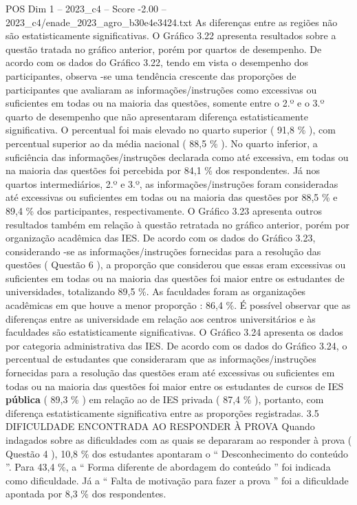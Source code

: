 \begin{textsample}{POS Dim 1 – 2023\_c4 – Score -2.00 – 2023\_c4/enade\_2023\_agro\_b30e4e3424.txt}
As diferenças entre as regiões não são estatisticamente significativas.
O Gráfico 3.22 apresenta resultados sobre a questão tratada no gráfico anterior, porém por quartos de desempenho.
De acordo com os dados do Gráfico 3.22, tendo em vista o desempenho dos participantes, observa -se uma tendência crescente das proporções de participantes que avaliaram as informações/instruções como excessivas ou suficientes em todas ou na maioria das questões, somente entre o 2.º e o 3.º quarto de desempenho que não apresentaram diferença estatisticamente significativa.
O percentual foi mais elevado no quarto superior ( 91,8 \% ), com percentual superior ao da média nacional ( 88,5 \% ).
No quarto inferior, a suficiência das informações/instruções declarada como até excessiva, em todas ou na maioria das questões foi percebida por 84,1 \% dos respondentes.
Já nos quartos intermediários, 2.º e 3.º, as informações/instruções foram consideradas até excessivas ou suficientes em todas ou na maioria das questões por 88,5 \% e 89,4 \% dos participantes, respectivamente.
O Gráfico 3.23 apresenta outros resultados também em relação à questão retratada no gráfico anterior, porém por organização acadêmica das IES.
De acordo com os dados do Gráfico 3.23, considerando -se as informações/instruções fornecidas para a resolução das questões ( Questão 6 ), a proporção que considerou que essas eram excessivas ou suficientes em todas ou na maioria das questões foi maior entre os estudantes de universidades, totalizando 89,5 \%.
As faculdades foram as organizações acadêmicas em que houve a menor proporção : 86,4 \%.
É possível observar que as diferenças entre as universidade em relação aos centros universitários e às faculdades são estatisticamente significativas.
O Gráfico 3.24 apresenta os dados por categoria administrativa das IES.
De acordo com os dados do Gráfico 3.24, o percentual de estudantes que consideraram que as informações/instruções fornecidas para a resolução das questões eram até excessivas ou suficientes em todas ou na maioria das questões foi maior entre os estudantes de cursos de IES \textbf{pública} ( 89,3 \% ) em relação ao de IES privada ( 87,4 \% ), portanto, com diferença estatisticamente significativa entre as proporções registradas. 3.5 DIFICULDADE ENCONTRADA AO RESPONDER À PROVA Quando indagados sobre as dificuldades com as quais se depararam ao responder à prova ( Questão 4 ), 10,8 \% dos estudantes apontaram o “ Desconhecimento do conteúdo ”.
Para 43,4 \%, a “ Forma diferente de abordagem do conteúdo ” foi indicada como dificuldade.
Já a “ Falta de motivação para fazer a prova ” foi a dificuldade apontada por 8,3 \% dos respondentes.

\end{textsample}
